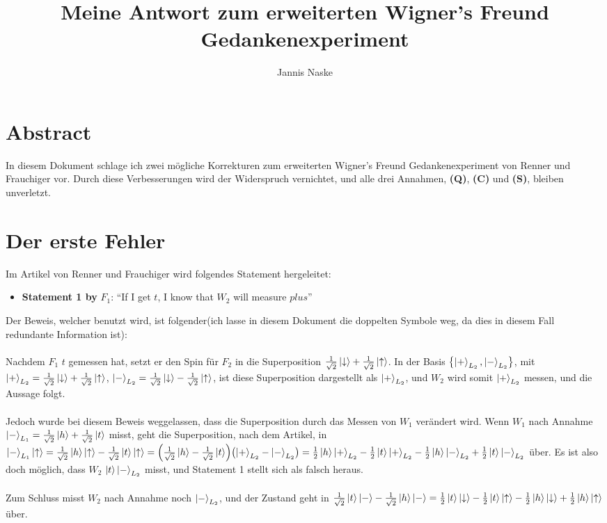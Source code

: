 \documentclass[a4paper]{article}
\title{Meine Antwort zum erweiterten Wigner's Freund Gedankenexperiment}
\author{Jannis Naske}
\begin{document}
\maketitle
{}

\section*{Abstract}
In diesem Dokument schlage ich zwei mögliche Korrekturen zum erweiterten Wigner's Freund Gedankenexperiment von Renner und Frauchiger vor.
Durch diese Verbesserungen wird der Widerspruch vernichtet, und alle drei Annahmen, \textbf{(Q)}, \textbf{(C)} und \textbf{(S)}, bleiben unverletzt.

\section*{Der erste Fehler}
Im Artikel von Renner und Frauchiger wird folgendes Statement hergeleitet:
\begin{itemize}
	\item \textbf{Statement 1 by} $F_1$: ``If I get $t$, I know that $W_2$ will measure $plus$''
\end{itemize}
Der Beweis, welcher benutzt wird, ist folgender(ich lasse in diesem Dokument die doppelten Symbole weg, da dies in diesem Fall redundante Information ist):\\\\
Nachdem $F_1$ $t$ gemessen hat, setzt er den Spin für $F_2$ in die Superposition $\frac{1}{\sqrt{2}} \ket{\downarrow} + \frac{1}{\sqrt{2}} \ket{\uparrow}$.
In der Basis $\qty{\ket{+}_{L_2}, \ket{-}_{L_2}}$, mit $\ket{+}_{L_2} = \frac{1}{\sqrt{2}} \ket{\downarrow} + \frac{1}{\sqrt{2}} \ket{\uparrow}$, $\ket{-}_{L_2} = \frac{1}{\sqrt{2}} \ket{\downarrow} - \frac{1}{\sqrt{2}} \ket{\uparrow}$,
ist diese Superposition dargestellt als $\ket{+}_{L_2}$, und $W_2$ wird somit $\ket{+}_{L_2}$ messen, und die Aussage folgt.\\\\
Jedoch wurde bei diesem Beweis weggelassen, dass die Superposition durch das Messen von $W_1$ verändert wird.
Wenn $W_1$ nach Annahme $\ket{-}_{L_1} = \frac{1}{\sqrt{2}}\ket{h} + \frac{1}{\sqrt{2}}\ket{t}$ misst, geht die Superposition, nach dem Artikel,
in $\ket{-}_{L_1}\ket{\uparrow} = \frac{1}{\sqrt{2}}\ket{h}\ket{\uparrow} - \frac{1}{\sqrt{2}}\ket{t}\ket{\uparrow} = \qty(\frac{1}{\sqrt{2}} \ket{h} - \frac{1}{\sqrt{2}} \ket{t})\qty(\ket{+}_{L_2} - \ket{-}_{L_2}) = \frac{1}{2}\ket{h}\ket{+}_{L_2} - \frac{1}{2}\ket{t}\ket{+}_{L_2} - \frac{1}{2}\ket{h}\ket{-}_{L_2} + \frac{1}{2}\ket{t}\ket{-}_{L_2}$ über. Es ist also doch möglich, dass $W_2$ $\ket{t}\ket{-}_{L_2}$ misst, und Statement 1 stellt sich als falsch heraus.\\\\
Zum Schluss misst $W_2$ nach Annahme noch $\ket{-}_{L_2}$, und der Zustand geht in $\frac{1}{\sqrt{2}}\ket{t}\ket{-} - \frac{1}{\sqrt{2}}\ket{h}\ket{-} = \frac{1}{2}\ket{t}\ket{\downarrow} - \frac{1}{2}\ket{t}\ket{\uparrow} - \frac{1}{2}\ket{h}\ket{\downarrow} + \frac{1}{2}\ket{h}\ket{\uparrow}$ über.
\end{document}
